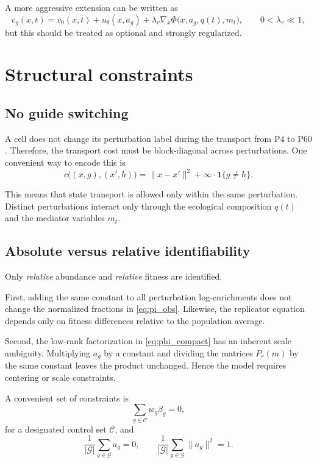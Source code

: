 \documentclass[11pt]{article}
\newcommand{\G}{\mathcal{G}}
\newcommand{\1}{\mathbf{1}}
\newcommand{\Pfour}{\mathrm{P4}}
\newcommand{\Psixty}{\mathrm{P60}}
\theoremstyle{plain}
\begin{document}
A more aggressive extension can be written as
\begin{equation}
 v_g(x,t)=v_0(x,t)+u_\theta(x,a_g)+\lambda_v\nabla_x\Phi\big(x,a_g,q(t),m_t\big),
 \qquad 0<\lambda_v\ll 1,
 \label{eq:drift_extension}
\end{equation}
but this should be treated as optional and strongly regularized.

\section{Structural constraints}

\subsection{No guide switching}

A cell does not change its perturbation label during the transport from $\Pfour$ to $\Psixty$. Therefore, the transport cost must be block-diagonal across perturbations. One convenient way to encode this is
\begin{equation}
 c\big((x,g),(x',h)\big)=\|x-x'\|^2 + \infty\cdot \1\{g\neq h\}.
 \label{eq:block_cost}
\end{equation}

This means that state transport is allowed only within the same perturbation. Distinct perturbations interact only through the ecological composition $q(t)$ and the mediator variables $m_t$.

\subsection{Absolute versus relative identifiability}

Only \emph{relative} abundance and \emph{relative} fitness are identified.

First, adding the same constant to all perturbation log-enrichments does not change the normalized fractions in \eqref{eq:pi_obs}. Likewise, the replicator equation depends only on fitness differences relative to the population average.

Second, the low-rank factorization in \eqref{eq:phi_compact} has an inherent scale ambiguity. Multiplying $a_g$ by a constant and dividing the matrices $P_r(m)$ by the same constant leaves the product unchanged. Hence the model requires centering or scale constraints.

A convenient set of constraints is
\begin{equation}
\sum_{g\in\mathcal C} w_g\beta_g = 0,
\label{eq:control_centering}
\end{equation}
for a designated control set $\mathcal C$, and
\begin{equation}
\frac{1}{|\G|}\sum_{g\in\G} a_g = 0,
\qquad
\frac{1}{|\G|}\sum_{g\in\G}\|a_g\|^2 = 1.
\label{eq:embedding_scale}
\end{equation}
\end{document}
